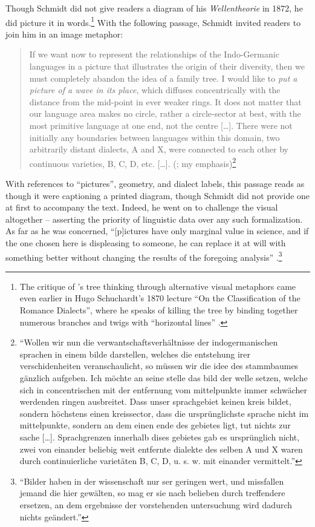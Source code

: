 \documentclass[output=paper]{langscibook}
\begin{document}
Though Schmidt did not give readers a diagram of his \emph{Wellentheorie} in 1872, he did picture it in words.\footnote{The critique of {\Schleicher}'s tree thinking through alternative visual metaphors came even earlier in Hugo Schuchardt's 1870 lecture ``On the Classification of the Romance Dialects'', where he speaks of killing the tree by binding together numerous branches and twigs with ``horizontal lines'' \citep[11]{Schuchardt19001870}.} With the following passage, Schmidt invited readers to join him in an image metaphor:

\begin{quotation}
If we want now to represent the relationships of the Indo-Germanic languages in a picture that illustrates the origin of their diversity, then we must completely abandon the idea of a family tree. I would like to \emph{put a picture of a wave in its place}, which diffuses concentrically with the distance from the mid-point in ever weaker rings. It does not matter that our language area makes no circle, rather a circle-sector at best, with the most primitive language at	one end, not the centre […]. There were not initially any boundaries between languages within this domain, two arbitrarily distant dialects, A and X, were connected to each other by continuous varieties, B, C, D, etc. […]. (\citealt[27--28]{Schmidt1872}; my emphasis)\footnote{``Wollen wir nun die verwantschaftsverhältnisse der indogermanischen sprachen in einem bilde darstellen, welches die entstehung irer verschidenheiten veranschaulicht, so müssen wir die idee des stammbaumes gänzlich aufgeben. Ich möchte an seine stelle das bild der welle setzen, welche sich in concentrischen mit der entfernung vom mittelpunkte immer schwächer werdenden ringen ausbreitet. Dass unser sprachgebiet keinen kreis bildet, sondern höchstens einen kreissector, dass die ursprünglichste sprache nicht im mittelpunkte, sondern an dem einen ende des gebietes ligt, tut nichts zur sache […]. Sprachgrenzen innerhalb dises gebietes gab es ursprünglich nicht, zwei von einander beliebig weit entfernte dialekte des selben A und X waren durch continuierliche varietäten B, C, D, u. s. w. mit einander vermittelt.''} 
\end{quotation}

With references to ``pictures'', geometry, and dialect labels, this passage reads as though it were captioning a printed diagram, though Schmidt did not provide one at first to accompany the text. Indeed, he went on to challenge the visual altogether -- asserting the priority of linguistic data over any such formalization. As far as he was concerned, ``[p]ictures have only marginal value in science, and if the one chosen here is displeasing to someone, he can replace it at will with something better without changing the results of the foregoing analysis'' \citep[28]{Schmidt1872}.\footnote{``Bilder haben in der wissenschaft nur ser geringen wert, und missfallen jemand die hier gewälten, so mag er sie nach belieben durch treffendere ersetzen, an dem ergebnisse der vorstehenden untersuchung wird dadurch nichts geändert.''}
\end{document}
